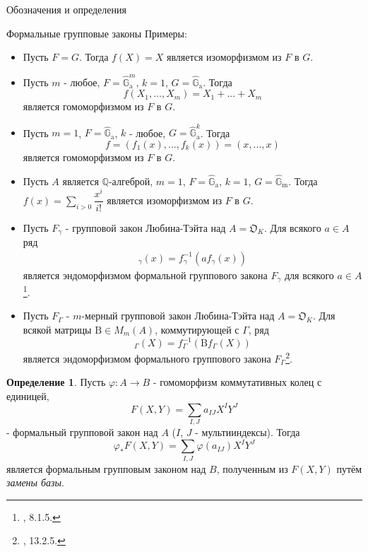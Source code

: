 \documentclass[a4paper,14pt]{extarticle}
\theoremstyle{definition}
\newtheorem{definition}{Определение}[section]
\newcommand{\Beta}{\mathrm{B}}
\newcommand{\bG}{\mathbb{G}}
\newcommand{\bQ}{\mathbb{Q}}
\newcommand{\fO}{\mathfrak{O}}
\newcommand{\GGa}{\hat{\bG}_{\mathrm{a}}}
\newcommand{\GGm}{\hat{\bG}_{\mathrm{m}}}
\begin{document}
\begin{section}{Обозначения и определения}
\begin{subsection}{Формальные групповые законы}
Примеры:
\begin{itemize}
    \item Пусть ${ F = G }$. Тогда ${ f(X) = X }$ является изоморфизмом из $F$ в $G$.
    \item Пусть $m$ - любое, ${ F = \GGa^m }$, ${ k = 1 }$, ${ G = \GGa }$. Тогда
    \begin{equation*}
        f(X_1, ..., X_m) = X_1 + ... + X_m
    \end{equation*}
    является гомоморфизмом из $F$ в $G$.
    \item Пусть ${ m = 1 }$, ${ F = \GGa }$, $k$ - любое, ${ G = \GGa^k }$. Тогда
    \begin{equation*}
        f = (f_1(x), ..., f_k(x)) = (x, ..., x)
    \end{equation*}
    является гомоморфизмом из $F$ в $G$.
    \item Пусть $A$ является $\bQ$-алгеброй, ${ m = 1 }$, ${ F = \GGa }$, ${ k = 1 }$, ${ G = \GGm }$. Тогда ${ f(x) = \sum\limits_{i > 0} \dfrac{x^i}{i!} }$ является изоморфизмом из $F$ в $G$.
    \item Пусть $F_\gamma$ - групповой закон Любина-Тэйта над ${ A = \fO_K }$. Для всякого ${ a \in A }$ ряд
    \begin{gather*}
        [a]_\gamma(x) =
        f_\gamma^{-1}(a f_\gamma(x))
    \end{gather*}
    является эндоморфизмом формальной группового закона $F_\gamma$ для всякого ${ a \in A }$\footnote{
        \cite{Hazewinkel}, 8.1.5.
    }.
    \item Пусть $F_\Gamma$ - $m$-мерный групповой закон Любина-Тэйта над ${ A = \fO_K }$. Для всякой матрицы ${ \Beta \in M_m(A) }$, коммутирующей с $\Gamma$, ряд
    \begin{equation*}
        [\Beta]_\Gamma(X) =
        f_\Gamma^{-1}(\Beta f_\Gamma(X))
    \end{equation*}
    является эндоморфизмом формального группового закона ${ F_\Gamma }$\footnote{
        \cite{Hazewinkel}, 13.2.5.
    }.
\end{itemize}

\begin{definition}\label{def:2.1:base_change}
    Пусть ${ \varphi : A \rightarrow B }$ - гомоморфизм коммутативных колец с единицей,
    \begin{equation*}
        F(X, Y) =
        \sum\limits_{I, J} a_{I J} X^I Y^J
    \end{equation*}
    - формальный групповой закон над $A$ ($I$, $J$ - мультииндексы). Тогда
    \begin{equation*}
        \varphi_* F(X, Y) =
        \sum\limits_{I, J} \varphi(a_{I J}) X^I Y^J
    \end{equation*}
    является формальным групповым законом над $B$, полученным из ${ F(X, Y) }$ путём \textit{замены базы}.
\end{definition}


\end{subsection}
\end{section}
\end{document}
